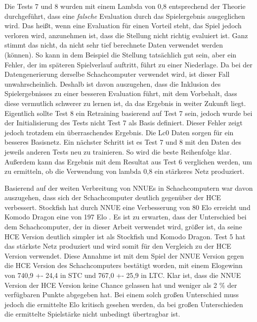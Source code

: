 Die Tests 7 und 8 wurden mit einem Lambda von 0,8 entsprechend der Theorie durchgeführt, dass eine \emph{falsche} Evaluation durch das Spielergebnis ausgeglichen wird. Das heißt, wenn eine Evaluation für einen Vorteil steht, das Spiel jedoch verloren wird, anzunehmen ist, dass die Stellung nicht richtig evaluiert ist. Ganz stimmt das nicht, da nicht sehr tief berechnete Daten verwendet werden (können). So kann in dem Beispiel die Stellung tatsächlich gut sein, aber ein Fehler, der im späteren Spielverlauf auftritt, führt zu einer Niederlage. Da bei der Datengenerierung derselbe Schachcomputer verwendet wird, ist dieser Fall unwahrscheinlich. Deshalb ist davon auszugehen, dass die Inklusion des Spielergebnisses zu einer besseren Evaluation führt, mit dem Vorbehalt, dass diese vermutlich schwerer zu lernen ist, da das Ergebnis in weiter Zukunft liegt. Eigentlich sollte Test 8 ein Retraining basierend auf Test 7 sein, jedoch wurde bei der Initialisierung des Tests nicht Test 7 als Basis definiert. Dieser Fehler zeigt jedoch trotzdem ein überraschendes Ergebnis. Die \ac{Lc0} Daten sorgen für ein besseres Basisnetz. Ein nächster Schritt ist es Test 7 und 8 mit den Daten des jeweils anderen Tests neu zu trainieren. So wird die beste Reihenfolge klar. Außerdem kann das Ergebnis mit dem Resultat aus Test 6 verglichen werden, um zu ermitteln, ob die Verwendung von lambda 0,8 ein stärkeres Netz produziert.

Basierend auf der weiten Verbreitung von \acp{NNUE} in Schachcomputern war davon auszugehen, dass sich der Schachcomputer deutlich gegenüber der \ac{HCE} verbessert. Stockfish hat durch \ac{NNUE} eine Verbesserung von 80 Elo erreicht und Komodo Dragon eine von 197 Elo \cite{StockfishIntroducingNNUE, KomodoDragon}. Es ist zu erwarten, dass der Unterschied bei dem Schachcomputer, der in dieser Arbeit verwendet wird, größer ist, da seine \ac{HCE} Version deutlich simpler ist als Stockfish und Komodo Dragon. Test 5 hat das stärkste Netz produziert und wird somit für den Vergleich zu der \ac{HCE} Version verwendet. Diese Annahme ist mit dem Spiel der \ac{NNUE} Version gegen die \ac{HCE} Version des Schachcomputers bestätigt worden, mit einem Elogewinn von 740,9 +- 24,4 in \ac{STC} und 767,0 +- 25,9 in \ac{LTC}. Klar ist, dass die \ac{NNUE} Version der \ac{HCE} Version keine Chance gelassen hat und weniger als 2 \% der verfügbaren Punkte abgegeben hat. Bei einem solch großen Unterschied muss jedoch die ermittelte Elo kritisch gesehen werden, da bei großen Unterschieden die ermittelte Spielstärke nicht unbedingt übertragbar ist.

